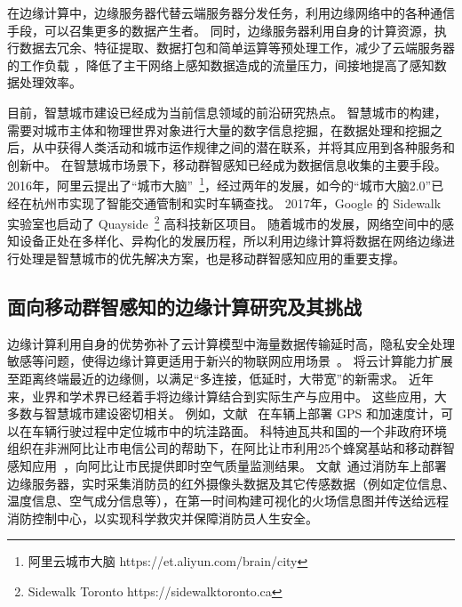 在边缘计算中，边缘服务器代替云端服务器分发任务，利用边缘网络中的各种通信手段，可以召集更多的数据产生者。
同时，边缘服务器利用自身的计算资源，执行数据去冗余、特征提取、数据打包和简单运算等预处理工作，减少了云端服务器的工作负载 ，降低了主干网络上感知数据造成的流量压力，间接地提高了感知数据处理效率。


目前，智慧城市建设已经成为当前信息领域的前沿研究热点。
智慧城市的构建，需要对城市主体和物理世界对象进行大量的数字信息挖掘，在数据处理和挖掘之后，从中获得人类活动和城市运作规律之间的潜在联系，并将其应用到各种服务和创新中。
在智慧城市场景下，移动群智感知已经成为数据信息收集的主要手段。
2016年，阿里云提出了“城市大脑”~\footnote{阿里云城市大脑 https://et.aliyun.com/brain/city}，经过两年的发展，如今的“城市大脑2.0”已经在杭州市实现了智能交通管制和实时车辆查找。
2017年，Google 的 Sidewalk 实验室也启动了 Quayside~\footnote{Sidewalk Toronto https://sidewalktoronto.ca} 高科技新区项目。
随着城市的发展，网络空间中的感知设备正处在多样化、异构化的发展历程，所以利用边缘计算将数据在网络边缘进行处理是智慧城市的优先解决方案，也是移动群智感知应用的重要支撑。

\subsection{面向移动群智感知的边缘计算研究及其挑战}


边缘计算利用自身的优势弥补了云计算模型中海量数据传输延时高，隐私安全处理敏感等问题，使得边缘计算更适用于新兴的物联网应用场景~\cite{DBLP:journals/cm/SunA16}。
将云计算能力扩展至距离终端最近的边缘侧，以满足“多连接，低延时，大带宽”的新需求。
近年来，业界和学术界已经着手将边缘计算结合到实际生产与应用中。
这些应用，大多数与智慧城市建设密切相关。
例如，文献~ 在车辆上部署 GPS 和加速度计，可以在车辆行驶过程中定位城市中的坑洼路面。
科特迪瓦共和国的一个非政府环境组织在非洲阿比让市电信公司的帮助下，在阿比让市利用25个蜂窝基站和移动群智感知应用~\cite{DBLP:conf/huc/ZhangXWC14}，向阿比让市民提供即时空气质量监测结果。
文献~通过消防车上部署边缘服务器，实时采集消防员的红外摄像头数据及其它传感数据（例如定位信息、温度信息、空气成分信息等），在第一时间构建可视化的火场信息图并传送给远程消防控制中心，以实现科学救灾并保障消防员人生安全。

